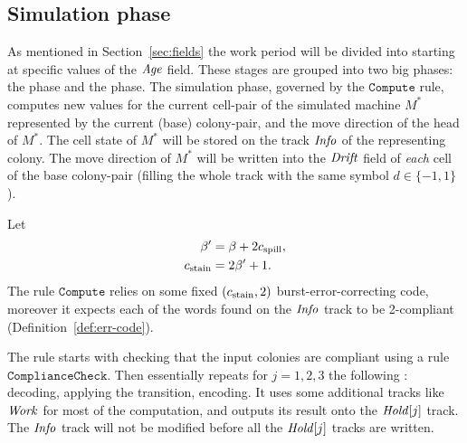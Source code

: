 \documentclass[11pt]{memoir}
\theoremstyle{definition} %
\newcommand{\fld}[1]{\ensuremath{\textit{#1\/}}}
\newcommand{\rul}[1]{\ensuremath{\texttt{#1}}}
\newcommand{\Age}{\fld{Age}} %
\newcommand{\Drift}{\fld{Drift}}
\newcommand{\Hold}{\fld{Hold}}
\newcommand{\Info}{\fld{Info}}
\newcommand{\Work}{\fld{Work}} %
\newcommand{\Compute}{\rul{Compute}}
\newcommand{\cns}[1]{c_{\textrm{\upshape #1}}}
\newcommand{\CSpill}{\cns{spill}}
\newcommand{\CStain}{\cns{stain}}
\begin{document}
\subsection{Simulation phase}\label{sec:simulation-phase}

As mentioned in Section~\ref{sec:fields} the work period will be divided into 
starting at specific values of the \( \Age \) field.
These stages are grouped into two big phases: the  phase and the 
phase.
The simulation phase, governed by the \( \Compute \) rule,
computes new values for the current cell-pair of the
simulated machine \( M^{*} \) represented by the current (base) colony-pair,
and the move direction of the head of  \( M^{*} \).
The cell state of \( M^{*} \) will be stored on the track \( \Info \) of the
representing colony.
The move direction of \( M^{*} \) 
will be written into the \( \Drift \) field of \emph{each} cell of the base colony-pair
(filling the whole track with the same symbol \( d\in\{-1,1\} \)).

Let
\begin{align}\label{eq:stain}
  \beta' &= \beta+2\CSpill,
\\   \CStain &= 2\beta'+ 1.
\end{align}
The rule \( \Compute \) relies on some fixed \( (\CStain, 2) \) burst-error-correcting
code, moreover it expects each of the words found on the \( \Info \) track to be
2-compliant (Definition~\ref{def:err-code}).

The rule starts with checking that the input colonies
are compliant using a rule \( \rul{ComplianceCheck} \).
Then essentially repeats for \( j=1,2,3 \)
the following : decoding, applying the transition, encoding.
It uses some additional tracks like \( \Work \) for most of the computation, and outputs
its result onto the \( \Hold[j] \) track.
The \( \Info \) track will not be modified before all the \( \Hold[j] \) tracks are written.
\end{document}

